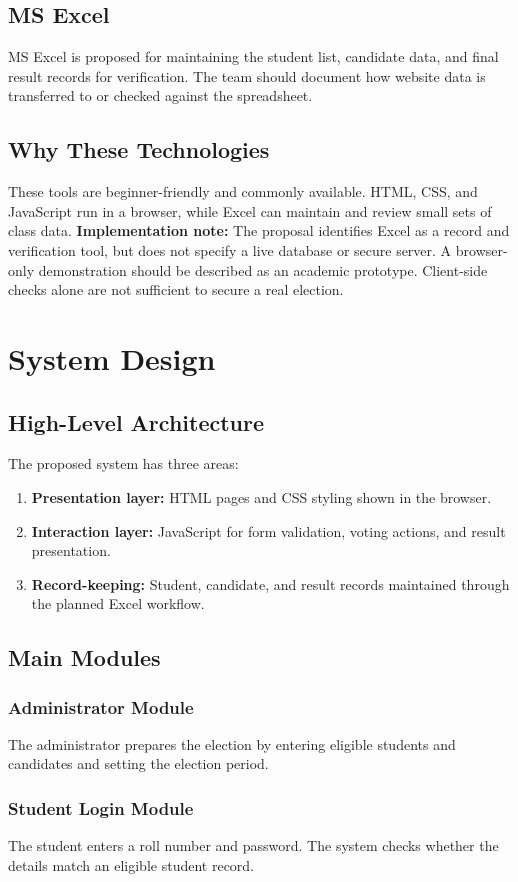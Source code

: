 \documentclass[12pt,a4paper]{report}
\begin{document}
\section{MS Excel}
MS Excel is proposed for maintaining the student list, candidate data, and final result records for verification. The team should document how website data is transferred to or checked against the spreadsheet.
\section{Why These Technologies}
These tools are beginner-friendly and commonly available. HTML, CSS, and JavaScript run in a browser, while Excel can maintain and review small sets of class data.
\textbf{Implementation note:} The proposal identifies Excel as a record and verification tool, but does not specify a live database or secure server. A browser-only demonstration should be described as an academic prototype. Client-side checks alone are not sufficient to secure a real election.

\chapter{System Design}
\section{High-Level Architecture}
The proposed system has three areas:
\begin{enumerate}
\item \textbf{Presentation layer:} HTML pages and CSS styling shown in the browser.
\item \textbf{Interaction layer:} JavaScript for form validation, voting actions, and result presentation.
\item \textbf{Record-keeping:} Student, candidate, and result records maintained through the planned Excel workflow.
\end{enumerate}
\section{Main Modules}
\subsection{Administrator Module}
The administrator prepares the election by entering eligible students and candidates and setting the election period.
\subsection{Student Login Module}
The student enters a roll number and password. The system checks whether the details match an eligible student record.
\end{document}
